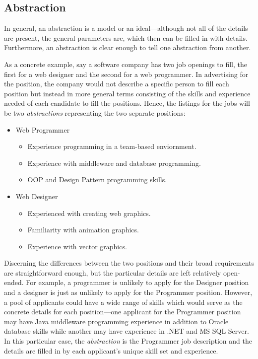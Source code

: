 \documentclass[12pt]{report}
\begin{document}
\subsection{Abstraction}
\begin{doublespace}
In general, an abstraction is a model or an ideal---although not all of the details are present, the general parameters are, which then can be filled in with details. Furthermore, an abstraction is clear enough to tell one abstraction from another. 

As a concrete example, say a software company has two job openings to fill, the first for a web designer and the second for a web programmer. In advertising for the position, the company would not describe a specific person to fill each position but instead in more general terms consisting of the skills and experience needed of each candidate to fill the positions. Hence, the listings for the jobs will be two \textit{abstractions} representing the two separate positions:

\begin{itemize}
\item Web Programmer
\begin{itemize}
\item Experience programming in a team-based enviornment.
\item Experience with middleware and database programming.
\item OOP and Design Pattern programming skills.
\end{itemize}
\item Web Designer
\begin{itemize}
\item Experienced with creating web graphics.
\item Familiarity with animation graphics.
\item Experience with vector graphics.
\end{itemize}
\end{itemize}

Discerning the differences between the two positions and their broad requirements are straightforward enough, but the particular details are left relatively open-ended. For example, a programmer is unlikely to apply for the Designer position and a designer is just as unlikely to apply for the Programmer position. However, a pool of applicants could have a wide range of skills which would serve as the concrete details for each position---one applicant for the Programmer position may have Java middleware programming experience in addition to Oracle database skills while another may have experience in .NET and MS SQL Server. In this particular case, the \textit{abstraction} is the Programmer job description and the details are filled in by each applicant's unique skill set and experience.


\end{doublespace}
\end{document}
